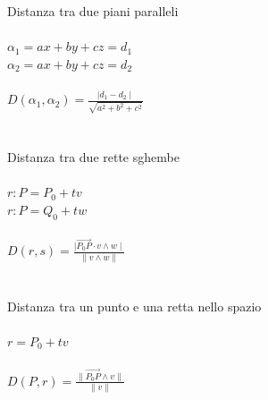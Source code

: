 \documentclass{article}
\begin{document}
{\large Distanza tra due piani paralleli}\\\\
\(\alpha_1=ax+by+cz=d_1\)\\
\(\alpha_2=ax+by+cz=d_2\)\\\\
\(D(\alpha_1,\alpha_2)=\frac{\mid d_1-d_2\mid}{\sqrt{a^2+b^2+c^2}}\)\\\\\\
{\large Distanza tra due rette sghembe}\\\\
\(r:P=P_0+tv\)\\\(r:P=Q_0+tw\)\\\\
\(D(r,s)=\frac{\mid\vec{P_0P}\cdot v \wedge w\mid}{\|v\wedge w\|}\)\\\\\\
{\large Distanza tra un punto e una retta nello spazio}\\\\
\(r=P_0+tv\)\\\\
\(D(P,r)=\frac{\|\vec{P_0P}\wedge v\|}{\|v\|}\)\\\\\\
\end{document}
